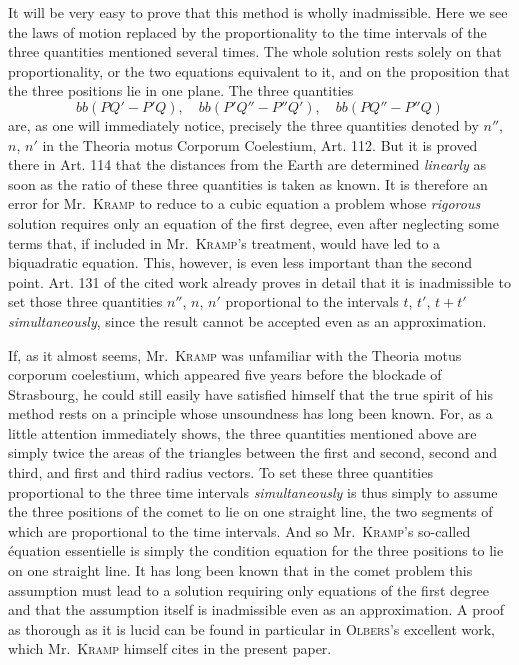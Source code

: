 It will be very easy to prove that this method is wholly inadmissible. Here we see the laws of motion replaced by the proportionality to the time intervals of the three quantities mentioned several times. The whole solution rests solely on that proportionality, or the two equations equivalent to it, and on the proposition that the three positions lie in one plane. The three quantities
\[
bb(PQ'-P'Q), \quad bb(P'Q''-P''Q'), \quad bb(PQ''-P''Q)
\]
are, as one will immediately notice, precisely the three quantities denoted by $n''$, $n$, $n'$ in the Theoria motus Corporum Coelestium, Art. 112. But it is proved there in Art. 114 that the distances from the Earth are determined \emph{linearly} as soon as the ratio of these three quantities is taken as known. It is therefore an error for Mr.\ \textsc{Kramp} to reduce to a cubic equation a problem whose \emph{rigorous} solution requires only an equation of the first degree, even after neglecting some terms that, if included in Mr.\ \textsc{Kramp}’s treatment, would have led to a biquadratic equation. This, however, is even less important than the second point. Art. 131 of the cited work already proves in detail that it is inadmissible to set those three quantities $n''$, $n$, $n'$ proportional to the intervals $t$, $t'$, $t+t'$ \emph{simultaneously}, since the result cannot be accepted even as an approximation.

If, as it almost seems, Mr.\ \textsc{Kramp} was unfamiliar with the Theoria motus corporum coelestium, which appeared five years before the blockade of Strasbourg, he could still easily have satisfied himself that the true spirit of his method rests on a principle whose unsoundness has long been known. For, as a little attention immediately shows, the three quantities mentioned above are simply twice the areas of the triangles between the first and second, second and third, and first and third radius vectors. To set these three quantities proportional to the three time intervals \emph{simultaneously} is thus simply to assume the three positions of the comet to lie on one straight line, the two segments of which are proportional to the time intervals. And so Mr.\ \textsc{Kramp}’s so-called équation essentielle is simply the condition equation for the three positions to lie on one straight line. It has long been known that in the comet problem this assumption must lead to a solution requiring only equations of the first degree and that the assumption itself is inadmissible even as an approximation. A proof as thorough as it is lucid can be found in particular in \textsc{Olbers}’s excellent work, which Mr.\ \textsc{Kramp} himself cites in the present paper.
